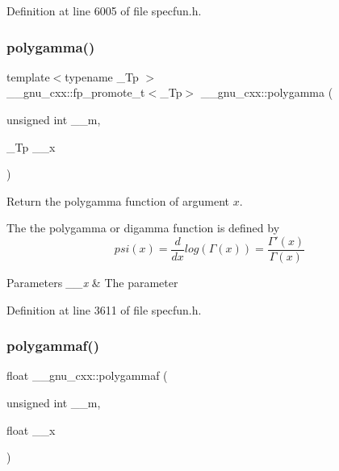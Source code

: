 Definition at line 6005 of file specfun.\+h.

\mbox{\label{group__gnu__math__spec__func_ga65e674e7fe1457e819897e0d608c18b8}} 
\subsubsection{\texorpdfstring{polygamma()}{polygamma()}}
{\footnotesize\ttfamily template$<$typename \+\_\+\+Tp $>$ \\
\+\_\+\+\_\+gnu\+\_\+cxx\+::fp\+\_\+promote\+\_\+t$<$\+\_\+\+Tp$>$ \+\_\+\+\_\+gnu\+\_\+cxx\+::polygamma (\begin{DoxyParamCaption}\item[{unsigned int}]{\+\_\+\+\_\+m,  }\item[{\+\_\+\+Tp}]{\+\_\+\+\_\+x }\end{DoxyParamCaption})\hspace{0.3cm}{\ttfamily [inline]}}

Return the polygamma function of argument $ x $.

The the polygamma or digamma function is defined by \[ psi(x) = \frac{d}{dx}log\left(\Gamma(x)\right) = \frac{\Gamma'(x)}{\Gamma(x)} \]


\begin{DoxyParams}{Parameters}
{\em \+\_\+\+\_\+x} & The parameter \\
\hline
\end{DoxyParams}


Definition at line 3611 of file specfun.\+h.

\mbox{\label{group__gnu__math__spec__func_ga91861fadef76d4f73afacffcac66e312}} 
\subsubsection{\texorpdfstring{polygammaf()}{polygammaf()}}
{\footnotesize\ttfamily float \+\_\+\+\_\+gnu\+\_\+cxx\+::polygammaf (\begin{DoxyParamCaption}\item[{unsigned int}]{\+\_\+\+\_\+m,  }\item[{float}]{\+\_\+\+\_\+x }\end{DoxyParamCaption})\hspace{0.3cm}{\ttfamily [inline]}}

